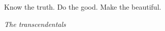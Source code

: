 \vspace{5cm}


\noindent
Know the truth. Do the good. Make the beautiful.

\begin{flushright}
\textit{The transcendentals}
\end{flushright}

